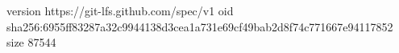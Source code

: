 version https://git-lfs.github.com/spec/v1
oid sha256:6955ff83287a32c9944138d3cea1a731e69cf49bab2d8f74c771667e94117852
size 87544
